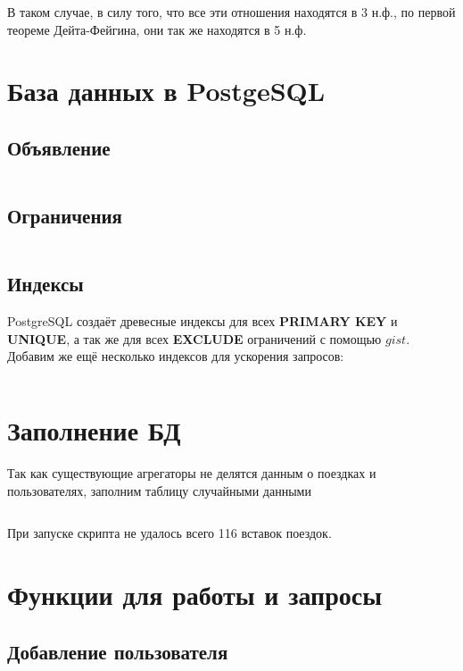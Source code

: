 \documentclass[fontsize=12pt]{article}
\begin{document}
В таком случае, в силу того, что все эти отношения находятся в 3 н.ф., по первой теореме Дейта-Фейгина, они так же находятся в 5 н.ф.

\section{База данных в PostgeSQL}

\subsection{Объявление}

\inputminted[frame=single]{sql}{scripts/create-database.sql}

\subsection{Ограничения}

\inputminted[frame=single]{sql}{scripts/add-constraints.sql}

\subsection{Индексы}

PostgreSQL создаёт древесные индексы для всех \textbf{PRIMARY KEY} и \textbf{UNIQUE}, а так же для всех \textbf{EXCLUDE} ограничений с помощью $gist$. Добавим же ещё несколько индексов для ускорения запросов:

\inputminted[frame=single]{sql}{scripts/add-indexes.sql}

\section{Заполнение БД}

Так как существующие агрегаторы не делятся данным о поездках и пользователях, заполним таблицу случайными данными

\inputminted[frame=single, fontsize=\small]{python}{scripts/fill-database.py}
	
При запуске скрипта не удалось всего 116 вставок поездок.	

\section{Функции для работы и запросы}

\subsection*{Добавление пользователя}
\end{document}
